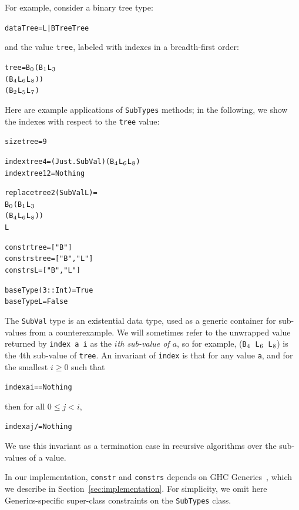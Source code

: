 \documentclass[10pt]{sigplanconf}
\newenvironment{code}{\begin{alltt}}{\end{alltt}}
\newcommand{\ttp}[1]{\texttt{#1}}
\newcommand{\sub}[1]{\(\sb{#1}\)}
\begin{document}
\noindent
For example, consider a binary tree type:
%
\begin{code}
data Tree = L | B Tree Tree
\end{code}
%
\noindent
and the value \ttp{tree}, labeled with indexes in a breadth-first order:
%
\begin{code}
tree = B\sub{0} (B\sub{1} L\sub{3}
             (B\sub{4} L\sub{6} L\sub{8}))
          (B\sub{2} L\sub{5} L\sub{7})
\end{code}
%
\noindent
Here are example applications of \ttp{SubTypes} methods; in the following, we
show the indexes with respect to the \ttp{tree} value:
%
\begin{code}
size tree = 9

index tree 4  = (Just . SubVal) (B\sub{4} L\sub{6} L\sub{8})
index tree 12 = Nothing

replace tree 2 (SubVal L) =
  B\sub{0} (B\sub{1} L\sub{3}
        (B\sub{4} L\sub{6} L\sub{8}))
     L

constr  tree = ["B"]
constrs tree = ["B", "L"]
constrs L    = ["B", "L"]

baseType (3 :: Int) = True
baseType L          = False
\end{code}
%
\noindent
The \ttp{SubVal} type is an existential data type, used as a generic container
for sub-values from a counterexample.  We will sometimes refer to the unwrapped
value returned by \ttp{index a i} as the \emph{$i$th sub-value of $a$}, so for
example, (\ttp{B\sub{4} L\sub{6} L\sub{8}}) is the 4th sub-value of \ttp{tree}.
An invariant of \ttp{index} is that for any value \ttp{a}, and for the smallest
$i \geq 0$ such that
%
\begin{code}
index a i == Nothing
\end{code}
%
\noindent
then for all $0 \leq j < i$,
%
\begin{code}
index a j /= Nothing
\end{code}
\noindent
We use this invariant as a termination case in recursive algorithms over the
sub-values of a value.

In our implementation, \ttp{constr} and \ttp{constrs} depends on GHC
Generics~\cite{generics}, which we describe in Section~\ref{sec:implementation}.
For simplicity, we omit here Generics-specific super-class constraints on the
\ttp{SubTypes} class.


\end{document}
